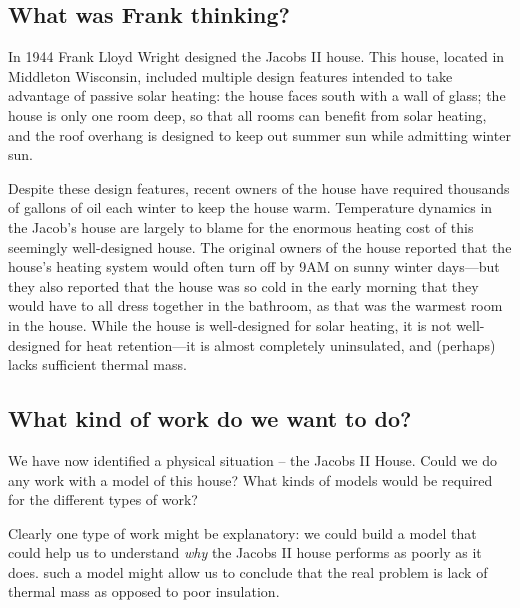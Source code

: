 \documentclass[10pt]{book}
\begin{document}
\subsection{What was Frank thinking?}

In 1944 Frank Lloyd Wright designed the Jacobs II house.  This house,
located in Middleton Wisconsin, included multiple design features
intended to take advantage of passive solar heating: the house faces
south with a wall of glass; the house is only one room deep, so that
all rooms can benefit from solar heating, and the roof overhang is
designed to keep out summer sun while admitting winter sun.


Despite these design features, recent owners of the house have
required thousands of gallons of oil each winter to keep the house
warm\cite{BuildingBalance}. Temperature dynamics in the Jacob's house
are largely to blame for the enormous heating cost of this seemingly
well-designed house.  The original owners of the house reported that
the house's heating system would often turn off by 9AM on sunny winter
days---but they also reported that the house was so cold in the early
morning that they would have to all dress together in the bathroom, as
that was the warmest room in the house.  While
the house is well-designed for solar heating, it is not well-designed
for heat retention---it is almost completely uninsulated, and
(perhaps) lacks sufficient thermal mass.

\subsection{What kind of work do we want to do?}

We have now identified a physical situation -- the Jacobs II House.  Could we do any work with a model of this house?  What kinds of models would be required for the different types of work?

Clearly one type of work might be explanatory:  we could build a model that could help us to understand {\it why} the Jacobs II house performs as poorly as it does.  such a model might allow us to conclude that the real problem is lack of thermal mass as opposed to poor insulation.
\end{document}
